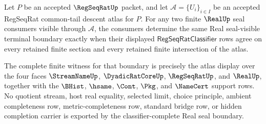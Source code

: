 \begin{theorem}
\label{thm:regseqrat-common-tail-descent-atlas-classifier-completeness}
Let $P$ be an accepted $\RegSeqRatUp$ packet, and let $\mathcal A=\{U_i\}_{i \in I}$ be an accepted RegSeqRat common-tail descent atlas for $P$. For any two finite $\RealUp$ seal consumers visible through $\mathcal A$, the consumers determine the same Real seal-visible terminal boundary exactly when their displayed $\mathsf{RegSeqRatClassifier}$ rows agree on every retained finite section and every retained finite intersection of the atlas.

The complete finite witness for that boundary is precisely the atlas display over the four faces $\StreamNameUp$, $\DyadicRatCoreUp$, $\RegSeqRatUp$, and $\RealUp$, together with the $\BHist$, $\hsame$, $\Cont$, $\Pkg$, and $\NameCert$ support rows. No quotient stream, host real equality, selected limit, choice principle, ambient completeness row, metric-completeness row, standard bridge row, or hidden completion carrier is exported by the classifier-complete Real seal boundary.
\end{theorem}
